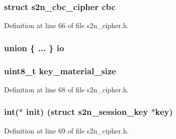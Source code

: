 \subsubsection[{\texorpdfstring{cbc}{cbc}}]{\setlength{\rightskip}{0pt plus 5cm}struct {\bf s2n\+\_\+cbc\+\_\+cipher} cbc}\hypertarget{structs2n__cipher_a1d48a8097823a3ed051e801f20f149b4}{}\label{structs2n__cipher_a1d48a8097823a3ed051e801f20f149b4}


Definition at line 66 of file s2n\+\_\+cipher.\+h.

\subsubsection[{\texorpdfstring{io}{io}}]{\setlength{\rightskip}{0pt plus 5cm}union \{ ... \}   io}\hypertarget{structs2n__cipher_a4ea01e42d7c92d02b72ff99c9cac3ab3}{}\label{structs2n__cipher_a4ea01e42d7c92d02b72ff99c9cac3ab3}
\subsubsection[{\texorpdfstring{key\+\_\+material\+\_\+size}{key_material_size}}]{\setlength{\rightskip}{0pt plus 5cm}uint8\+\_\+t key\+\_\+material\+\_\+size}\hypertarget{structs2n__cipher_a4c6bbff7566595ecff207dc0b73b3ae8}{}\label{structs2n__cipher_a4c6bbff7566595ecff207dc0b73b3ae8}


Definition at line 68 of file s2n\+\_\+cipher.\+h.

\subsubsection[{\texorpdfstring{init}{init}}]{\setlength{\rightskip}{0pt plus 5cm}int($\ast$ init) (struct {\bf s2n\+\_\+session\+\_\+key} $\ast$key)}\hypertarget{structs2n__cipher_a80fc23a245ab999bcc8dcc5b949cc542}{}\label{structs2n__cipher_a80fc23a245ab999bcc8dcc5b949cc542}


Definition at line 69 of file s2n\+\_\+cipher.\+h.


